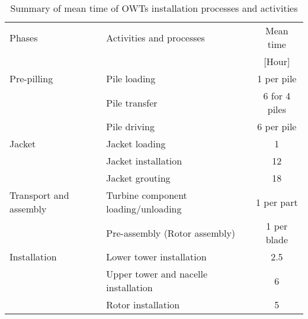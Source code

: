 
\begin{table}
\label{tab:times}

\begin{tabular}{llc}
\hline 
Phases & Activities and processes & Mean time \\ 
& & [Hour] \\ 
\hline 
Pre-pilling & Pile loading & 1 per pile \\
 & Pile transfer & 6 for 4 piles\\
 & Pile driving & 6 per pile\\
\hline
Jacket & Jacket loading & 1\\
 & Jacket installation & 12\\
 & Jacket grouting & 18\\
\hline
Transport and assembly & Turbine component loading/unloading & 1 per part\\
 & Pre-assembly (Rotor assembly) & 1 per blade  \\
\hline
Installation & Lower tower installation & 2.5\\
 & Upper tower and nacelle installation & 6\\
 & Rotor installation & 5\\
\hline 
\end{tabular} 

\caption{Summary of mean time of OWTs installation processes and activities}
\end{table}
